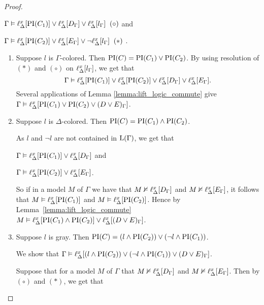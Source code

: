 \begin{proof}
\begin{indproof}
			$\Gamma \entails \lift{\Delta}{ \PI(C_1) }{x} \lor
			\lift{\Delta}{ D_\Gamma }{x} \lor
			\lift{\Delta}{ l_\Gamma }{x} \;\; {(\circ)} $
			and

			$\Gamma \entails \lift{\Delta}{ \PI(C_2) }{x} \lor
			\lift{\Delta}{ E_\Gamma }{x} \lor
			\lnot \lift{\Delta}{ l_\Gamma }{x} \;\; {(*)}$ .


			\begin{enumerate}
				\item Suppose $l$ is $\Gamma$-colored.
					Then $\PI(C) = \PI(C_1) \lor \PI(C_2)$.
					By using resolution of ${(*)}$ and ${(\circ)}$ on $\lift{\Delta}{l_\Gamma}{x}$, we get that 
					$$\Gamma \entails\lift{\Delta}{ \PI(C_1) }{x} \lor \lift{\Delta}{ \PI(C_2) }{x} \lor
					\lift{\Delta}{ D_\Gamma }{x} \lor
					\lift{\Delta}{ E_\Gamma }{x}.$$
					Several applications of Lemma \ref{lemma:lift_logic_commute} give
					$\Gamma \entails\lift{\Delta}{ \PI(C_1)  \lor  \PI(C_2) \lor (D \lor E)_\Gamma }{x}$.

				\item Suppose $l$ is $\Delta$-colored.
					Then $\PI(C) = \PI(C_1) \land \PI(C_2)$.

					As $l$ and $\lnot l$ are not contained in $\Lang(\Gamma)$, we get that 

					$\Gamma \entails \lift{\Delta}{ \PI(C_1) }{x} \lor
					\lift{\Delta}{ D_\Gamma }{x}$
					and

					$\Gamma \entails \lift{\Delta}{ \PI(C_2) }{x} \lor
					\lift{\Delta}{ E_\Gamma }{x}$.

					So if in a model $M$ of $\Gamma$ we have that
					$M \notentails \lift{\Delta}{ D_\Gamma }{x}$ and 
					$M \notentails \lift{\Delta}{ E_\Gamma }{x}$, it follows that $M \entails \lift{\Delta}{ \PI(C_1) }{x}$ and $M \entails \lift{\Delta}{ \PI(C_2) }{x}$. Hence by Lemma~\ref{lemma:lift_logic_commute}
					$M \entails \lift{\Delta}{ \PI(C_1) \land \PI(C_2) }{x} \lor
					\lift{\Delta}{ (D \lor E)_\Gamma }{x}$.

				\item Suppose $l$ is gray.
					Then $\PI(C) =  (l \land \PI(C_2)) \lor (\lnot l \land \PI(C_1))$.

					We show that 
					$\Gamma \entails \lift{\Delta}{(l \land \PI(C_2)) \lor (\lnot l \land \PI(C_1)) \lor (D \lor E)_\Gamma  }{x} $. 

					Suppose that for a model $M$ of $\Gamma$ that 
					$M \notentails \lift{\Delta}{ D_\Gamma }{x}$ and 
					$M \notentails \lift{\Delta}{ E_\Gamma }{x}$.
					Then by ${(\circ)}$
					and ${(*)}$, we get that\nopagebreak


\end{enumerate}
\end{indproof}
\end{proof}
